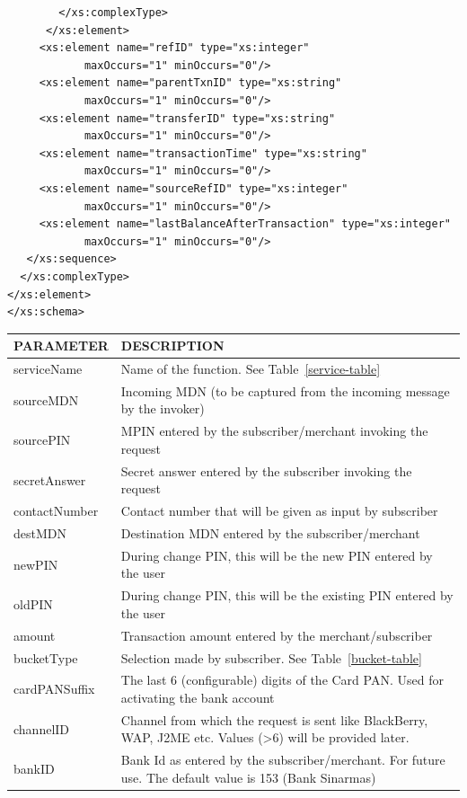 \documentclass[11pt,titlepage]{article}
\begin{document}
\begin{verbatim}
        </xs:complexType>
      </xs:element>
     <xs:element name="refID" type="xs:integer" 
            maxOccurs="1" minOccurs="0"/>
     <xs:element name="parentTxnID" type="xs:string" 
            maxOccurs="1" minOccurs="0"/>
     <xs:element name="transferID" type="xs:string" 
            maxOccurs="1" minOccurs="0"/>
     <xs:element name="transactionTime" type="xs:string" 
            maxOccurs="1" minOccurs="0"/>
     <xs:element name="sourceRefID" type="xs:integer" 
            maxOccurs="1" minOccurs="0"/>
     <xs:element name="lastBalanceAfterTransaction" type="xs:integer" 
            maxOccurs="1" minOccurs="0"/>
   </xs:sequence>
  </xs:complexType>
</xs:element>
</xs:schema>
\end{verbatim}

\begin{table}
\centering
\begin{tabular}{|p{4cm}|p{9cm}|}
\hline
{\bf PARAMETER} & {\bf DESCRIPTION}\\
\hline
\hline
serviceName & Name of the function. See Table~\ref{service-table} \\
\hline
sourceMDN & Incoming MDN (to be captured from the incoming message by the  invoker) \\
\hline
sourcePIN & MPIN entered by the subscriber/merchant invoking the request \\
\hline
secretAnswer & Secret answer entered by the subscriber invoking the request \\
\hline
contactNumber & Contact number that will be given as input by subscriber \\
\hline
destMDN & Destination MDN entered by the subscriber/merchant \\ 
\hline
newPIN & During change PIN, this will be the new PIN entered by the user \\
\hline
oldPIN & During change PIN, this will be the existing PIN entered by the user \\
\hline
amount & Transaction amount entered by the merchant/subscriber \\
\hline
bucketType & Selection made by subscriber. See Table~\ref{bucket-table}\\
\hline
cardPANSuffix & The last 6 (configurable) digits of the Card PAN. Used for activating the bank account \\
\hline
channelID & Channel from which the request is sent like BlackBerry, WAP, J2ME etc. Values (>6) will be provided later. \\
\hline
bankID & Bank Id as entered by the subscriber/merchant. For future use. The default value is 153 (Bank Sinarmas) \\

\end{tabular}
\end{table}
\end{document}
